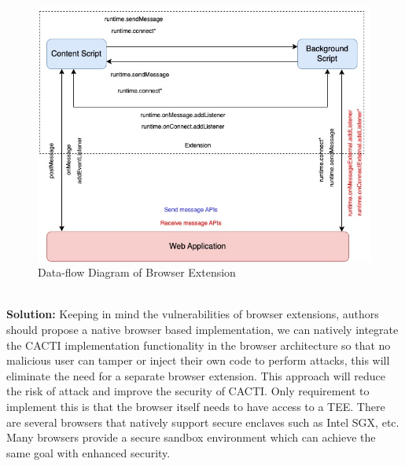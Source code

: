 \documentclass[runningheads,10pt]{llncs}
\begin{document}
\begin{enumerate}
		\begin{figure}[h]
			\centering
			\includegraphics[scale=0.5]{./imgs/browser_extensio_flow.jpg}
			\caption{Data-flow Diagram of Browser Extension \cite{ref2}}
			\label{fig:browserfig}
		\end{figure}

		\textbf{\\Solution:} Keeping in mind the vulnerabilities of browser extensions, authors should propose a native browser based implementation, we can natively integrate the CACTI implementation functionality in the browser architecture so that no malicious user can tamper or inject their own code to perform attacks, this will eliminate the need for a separate browser extension. This approach will reduce the risk of attack and improve the security of CACTI. Only requirement to implement this is that the browser itself needs to have access to a TEE. There are several browsers that natively support secure enclaves such as Intel SGX, etc. Many browsers provide a secure sandbox environment which can achieve the same goal with enhanced security.\\


\end{enumerate}
\end{document}
